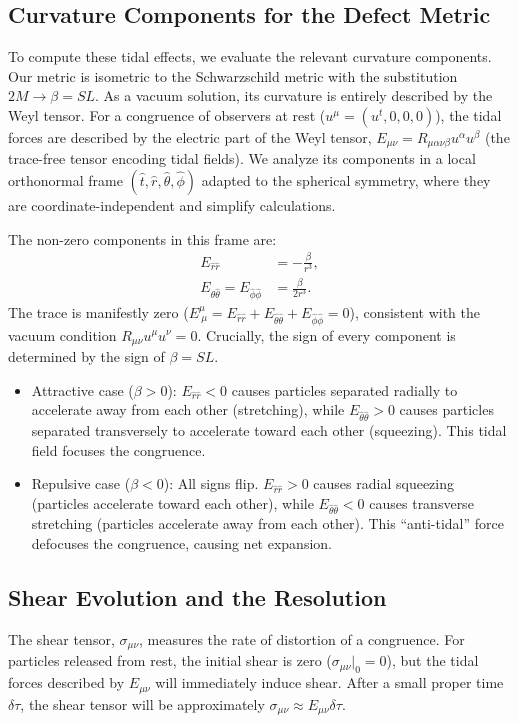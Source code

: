 \documentclass[%
  reprint,
  superscriptaddress,
  showpacs,
  showkeys,
  amsmath,amssymb,
  pra,
  longbibliography,
  floatfix,
  x11names
]{revtex4-2}
\begin{document}
\subsection{Curvature Components for the Defect Metric}
To compute these tidal effects, we evaluate the relevant curvature components. Our metric is isometric to the Schwarzschild metric with the substitution $2M \to \beta = SL$. As a vacuum solution, its curvature is entirely described by the Weyl tensor. For a congruence of observers at rest ($u^\mu = (u^t, 0, 0, 0)$), the tidal forces are described by the electric part of the Weyl tensor, $E_{\mu\nu} = R_{\mu\alpha\nu\beta}u^\alpha u^\beta$ (the trace-free tensor encoding tidal fields). We analyze its components in a local orthonormal frame $(\hat{t}, \hat{r}, \hat{\theta}, \hat{\phi})$ adapted to the spherical symmetry, where they are coordinate-independent and simplify calculations.

The non-zero components in this frame are:
\begin{align}
E_{\hat{r}\hat{r}} &= -\frac{\beta}{r^3}, \\
E_{\hat{\theta}\hat{\theta}} = E_{\hat{\phi}\hat{\phi}} &= \frac{\beta}{2r^3}.
\end{align}
The trace is manifestly zero ($E^\mu_{\ \mu} = E_{\hat{r}\hat{r}} + E_{\hat{\theta}\hat{\theta}} + E_{\hat{\phi}\hat{\phi}} = 0$), consistent with the vacuum condition $R_{\mu\nu}u^\mu u^\nu = 0$. Crucially, the sign of every component is determined by the sign of $\beta = SL$.

\begin{itemize}
    \item {Attractive case ($\beta > 0$):} $E_{\hat{r}\hat{r}} < 0$ causes particles separated radially to accelerate away from each other (stretching), while $E_{\hat{\theta}\hat{\theta}} > 0$ causes particles separated transversely to accelerate toward each other (squeezing). This tidal field focuses the congruence.
    \item {Repulsive case ($\beta < 0$):} All signs flip. $E_{\hat{r}\hat{r}} > 0$ causes radial squeezing (particles accelerate toward each other), while $E_{\hat{\theta}\hat{\theta}} < 0$ causes transverse stretching (particles accelerate away from each other). This ``anti-tidal'' force defocuses the congruence, causing net expansion.
\end{itemize}

\subsection{Shear Evolution and the Resolution}
The shear tensor, $\sigma_{\mu\nu}$, measures the rate of distortion of a congruence. For particles released from rest, the initial shear is zero ($\sigma_{\mu\nu}|_0 = 0$), but the tidal forces described by $E_{\mu\nu}$ will immediately induce shear. After a small proper time $\delta\tau$, the shear tensor will be approximately $\sigma_{\mu\nu} \approx E_{\mu\nu} \delta\tau$.
\end{document}
